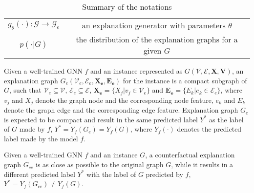 \begin{table}[th]
\begin{tabular}{c|c}
         $ g_\theta(\cdot): \mathcal{G}\rightarrow \mathcal{G}_e$ & an explanation generator with parameters $\theta$ \\
         $ p(\cdot| G)$ &the distribution of the explanation graphs for a given $G$\\
    \bottomrule
    \end{tabular}
    \caption{Summary of the notations}
    \label{tab:notation}
\end{table}

\begin{definition}
Given a well-trained GNN $f$ and an instance represented as $G(\mathcal{V},\mathcal{E},\mathbf{X},\mathbf{V})$, an explanation graph $G_{e}(\mathcal{V}_e,\mathcal{E}_e, \mathbf{X_e}, \mathbf{E_e})$ for the instance is a compact subgraph of $G$, such that $\mathcal{V}_e\subseteq \mathcal{V}$, $\mathcal{E}_e\subseteq \mathcal{E}$, $\mathbf{X_e}=\{X_j|v_j\in \mathcal{V}_e\}$ and $\mathbf{E_e}=\{E_k|e_k\in\mathcal{E}_e\}$, where $v_j$ and $X_j$ denote the graph node and the corresponding node feature, $e_k$ and $E_k$ denote the graph edge and the corresponding edge feature. Explanation graph $G_e$ is expected to be compact and result in the same predicted label $Y^\ast$ as the label of $G$ made by $f$, \ie $Y^\ast = Y_f(G_e)=Y_f(G)$, where $Y_f(\cdot)$ denotes the predicted label made by the model $f$.
\end{definition}

\begin{definition}
Given a well-trained GNN $f$ and an instance $G$, a counterfactual explanation graph $G_{ce}$ is as close as possible to the original graph $G$, while it results in a different predicted label $Y^\ast$ with the label of $G$ predicted by $f$, \ie $Y^\ast = Y_f(G_{ce})\neq Y_f(G)$.
\end{definition}

